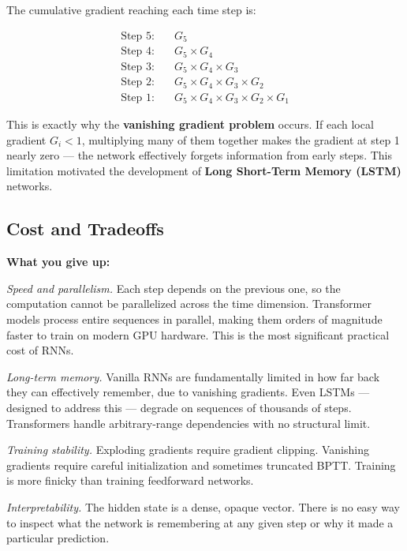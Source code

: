 \documentclass[12pt,a4paper]{article}
\begin{document}
The cumulative gradient reaching each time step is:

\begin{align}
\text{Step 5:} & \quad G_5 \\
\text{Step 4:} & \quad G_5 \times G_4 \\
\text{Step 3:} & \quad G_5 \times G_4 \times G_3 \\
\text{Step 2:} & \quad G_5 \times G_4 \times G_3 \times G_2 \\
\text{Step 1:} & \quad G_5 \times G_4 \times G_3 \times G_2 \times G_1
\end{align}

This is exactly why the \textbf{vanishing gradient problem} occurs. If each local
gradient $G_i < 1$, multiplying many of them together makes the gradient at step 1
nearly zero --- the network effectively forgets information from early steps. This
limitation motivated the development of \textbf{Long Short-Term Memory (LSTM)} networks.

\subsection{Cost and Tradeoffs}

\textbf{What you give up:}

\medskip
\noindent\textit{Speed and parallelism.}
Each step depends on the previous one, so the computation cannot be parallelized across
the time dimension. Transformer models process entire sequences in parallel, making them
orders of magnitude faster to train on modern GPU hardware. This is the most significant
practical cost of RNNs.

\medskip
\noindent\textit{Long-term memory.}
Vanilla RNNs are fundamentally limited in how far back they can effectively remember,
due to vanishing gradients. Even LSTMs --- designed to address this --- degrade on
sequences of thousands of steps. Transformers handle arbitrary-range dependencies with
no structural limit.

\medskip
\noindent\textit{Training stability.}
Exploding gradients require gradient clipping. Vanishing gradients require careful
initialization and sometimes truncated BPTT. Training is more finicky than training
feedforward networks.

\medskip
\noindent\textit{Interpretability.}
The hidden state is a dense, opaque vector. There is no easy way to inspect what the
network is remembering at any given step or why it made a particular prediction.
\end{document}
